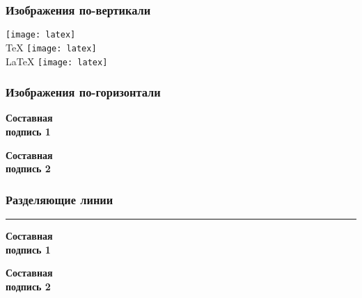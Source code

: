 
\begin{frame}
    \frametitle{Изображения по-вертикали}
    \centering
    \vfill
    \texttt{[image: latex]} \\
    \TeX
    \vfill
    \texttt{[image: latex]} \\
    \LaTeX
    \vfill
    \texttt{[image: latex]} \\
    \vfill
\end{frame}


\begin{frame}
    \frametitle{Изображения по-горизонтали}
    \begin{minipage}[t]{0.47\linewidth}
        \textbf{Составная \\ подпись 1}
    \end{minipage}
    \hfill
    \begin{minipage}[t]{0.47\linewidth}
        \textbf{Составная \\ подпись 2}
    \end{minipage}
\end{frame}


\begin{frame}
    \frametitle{Разделяющие линии}
    \begin{minipage}[c]{0.47\linewidth}
        \bigskip
        \hrule{}
        \bigskip
        \textbf{Составная \\ подпись 1}
    \end{minipage}
    \hfill
    \vrule{}
    \hfill
    \begin{minipage}[c]{0.47\linewidth}
        \flushright
        \textbf{Составная \\ подпись 2}
    \end{minipage}
\end{frame}

